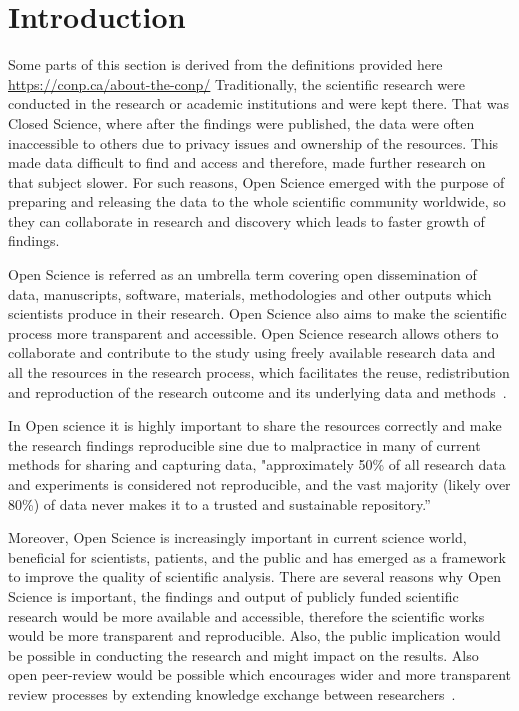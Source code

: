 \chapter{Introduction}

\label{introduction}

Some parts of this section is derived from the definitions provided here \url{https://conp.ca/about-the-conp/}
Traditionally, the scientific research were conducted in the research or academic institutions and were kept there. That was Closed Science, where after the findings were published, the data were often inaccessible to others due to privacy issues and ownership of the resources. This made data difficult to find and access and therefore, made further research on that subject slower. For such reasons, Open Science emerged with the purpose of preparing and releasing the data to the whole scientific community worldwide, so they can collaborate in research and discovery which leads to faster growth of findings.

Open Science is referred as an umbrella term covering open dissemination of data, manuscripts, software, materials, methodologies and other outputs which scientists produce in their research. Open Science also aims to make the scientific process more transparent and accessible. Open Science research allows others to collaborate and contribute to the study using freely available research data and all the resources in the research process, which facilitates the reuse, redistribution and reproduction of the research outcome and its underlying data and methods~\cite{bartling2014opening}.

In Open science it is highly important to share the resources correctly and make the research findings reproducible sine due to malpractice in many of current methods for sharing and capturing data, "approximately 50\% of all research data and experiments is considered not reproducible, and the vast majority (likely over 80\%) of data never makes it to a trusted and sustainable repository.”~\cite{ayris2016realising}

Moreover, Open Science is increasingly important in current science world, beneficial for scientists, patients, and the public and has emerged as a framework to improve the quality of scientific analysis. There are several reasons why Open Science is important, the findings and output of publicly funded scientific research would be more available and accessible, therefore the scientific works would be more transparent and reproducible. Also, the public implication would be possible in conducting the research and might impact on the results. Also open peer-review would be possible which encourages wider and more transparent review processes by extending knowledge exchange between researchers~\cite{wolfram2020open,ross2019guidelines}. 


